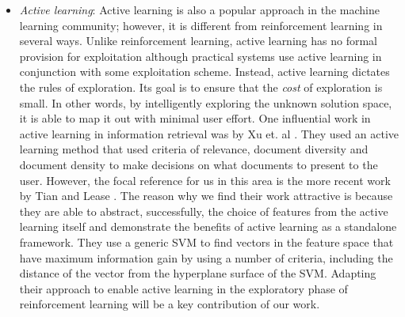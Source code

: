 \documentclass{acm_proc_article-sp}
\begin{document}
\begin{itemize}
\item \emph{Active learning}: Active learning is also a popular approach in the machine learning community; however, it is different from reinforcement learning in several ways. Unlike reinforcement learning, active learning has no formal provision for exploitation although practical systems use active learning in conjunction with some exploitation scheme. Instead, active learning dictates the rules of exploration. Its goal is to ensure that the \emph{cost} of exploration is small. In other words, by intelligently exploring the unknown solution space, it is able to map it out with minimal user effort. One influential work in active learning in information retrieval was by Xu et. al \cite{active2}. They used an active learning method that used criteria of relevance, document diversity and document density to make decisions on what documents to present to the user. However, the focal reference for us in this area is the more recent work by Tian and Lease \cite{aibo}. The reason why we find their work attractive is because they are able to abstract, successfully, the choice of features from the active learning itself and demonstrate the benefits of active learning as a standalone framework. They use a generic SVM to find vectors in the feature space that have maximum information gain by using a number of criteria, including the distance of the vector from the hyperplane surface of the SVM. Adapting their approach to enable active learning in the exploratory phase of reinforcement learning will be a key contribution of our work. 
\end{itemize}
\end{document}
